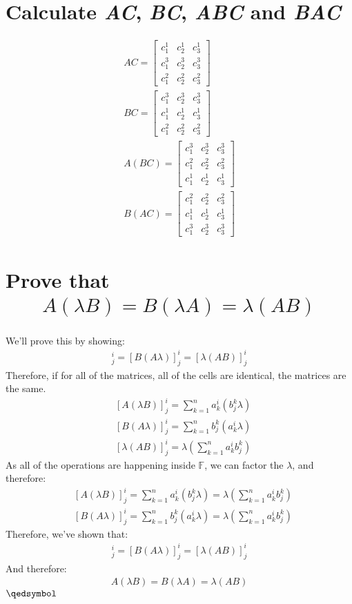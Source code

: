 \documentclass[a4paper, 12pt]{article}
\newcommand{\F}{\ensuremath{\mathbb{F}}}
\newcommand{\eq}[1]{\begin{align*}#1\end{align*}}
\renewcommand{\qed}{\hfill\(\qedsymbol\)}
\begin{document}
\begin{titlepage}
\end{titlepage}

\setcounter{section}{2}
\section{Calculate \textit{AC}, \textit{BC}, \textit{ABC} and \textit{BAC}}
\eq{
    AC=\begin{bmatrix}
        c^1_1 & c^1_2 & c^1_3 \\
        c^3_1 & c^3_2 & c^3_3 \\
        c^2_1 & c^2_2 & c^2_3
    \end{bmatrix}
    \\
    BC=\begin{bmatrix}
        c^3_1 & c^3_2 & c^3_3 \\
        c^1_1 & c^1_2 & c^1_3 \\
        c^2_1 & c^2_2 & c^2_3
    \end{bmatrix}
    \\
    A(BC)=\begin{bmatrix}
        c^3_1 & c^3_2 & c^3_3 \\
        c^2_1 & c^2_2 & c^2_3 \\
        c^1_1 & c^1_2 & c^1_3
    \end{bmatrix}
    \\
    B(AC)=\begin{bmatrix}
        c^2_1 & c^2_2 & c^2_3 \\
        c^1_1 & c^1_2 & c^1_3 \\
        c^3_1 & c^3_2 & c^3_3
    \end{bmatrix}
}

\setcounter{section}{5}
\section{Prove that \eq{A(\lambda{B})=B(\lambda{A})=\lambda(AB)}}
We'll prove this by showing:
\eq{
    [A(\lambda{B})]^i_j=[B(A\lambda)]^i_j=[\lambda(AB)]^i_j
}
Therefore, if for all of the matrices, all of the cells are identical, the matrices are the same.
\eq{
    &[A(\lambda{B})]^i_j=\sum^n_{k=1}a^i_k(b^k_j\lambda)\\
    &[B(A\lambda)]^i_j=\sum^n_{k=1}b^k_j(a^i_k\lambda)\\
    &[\lambda(AB)]^i_j=\lambda(\sum^n_{k=1}a^i_kb^k_j)
}
As all of the operations are happening inside $\F$, we can factor the $\lambda$, and therefore:
\eq{
    &[A(\lambda{B})]^i_j=\sum^n_{k=1}a^i_k(b^k_j\lambda)=\lambda(\sum^n_{k=1}a^i_kb^k_j)\\
    &[B(A\lambda)]^i_j=\sum^n_{k=1}b^k_j(a^i_k\lambda)=\lambda(\sum^n_{k=1}a^i_kb^k_j)
}
Therefore, we've shown that:
\eq{
    [A(\lambda{B})]^i_j=[B(A\lambda)]^i_j=[\lambda(AB)]^i_j
}
And therefore:
\eq{
    A(\lambda{B})=B(\lambda{A})=\lambda(AB)
}
\qed
\end{document}
